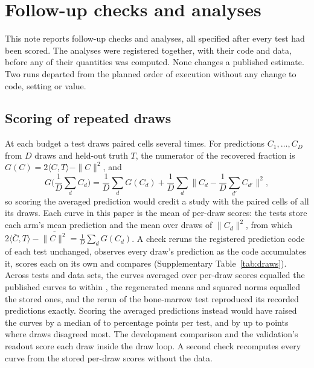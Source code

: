 \section{Follow-up checks and analyses}\label{sec:review}
This note reports follow-up checks and analyses, all specified after every test had been scored. The analyses were registered together, with their code and data, before any of their quantities was computed. None changes a published estimate. Two runs departed from the planned order of execution without any change to code, setting or value.

\subsection*{Scoring of repeated draws}
At each budget a test draws paired cells several times. For predictions $C_1,\dots,C_D$ from $D$ draws and held-out truth $T$, the numerator of the recovered fraction is $G(C)=2\langle C,T\rangle-\|C\|^2$, and
\[
G\Big(\frac1D\sum_dC_d\Big)=\frac1D\sum_dG(C_d)+\frac1D\sum_d\Big\|C_d-\frac1D\sum_{d'}C_{d'}\Big\|^2 ,
\]
so scoring the averaged prediction would credit a study with the paired cells of all its draws. Each curve in this paper is the mean of per-draw scores: the tests store each arm's mean prediction and the mean over draws of $\|C_d\|^2$, from which $2\langle\bar C,T\rangle-\overline{\|C\|^2}=\frac1D\sum_dG(C_d)$. A check reruns the registered prediction code of each test unchanged, observes every draw's prediction as the code accumulates it, scores each on its own and compares (Supplementary Table~\ref{tab:draws}). Across \RvDrawTests{} tests and data sets, the curves averaged over per-draw scores equalled the published curves to within \RvDrawMaxDiff, the regenerated means and squared norms equalled the stored ones, and the rerun of the bone-marrow test reproduced its recorded predictions exactly. Scoring the averaged predictions instead would have raised the curves by a median of \RvDrawInflMedianMin{} to \RvDrawInflMedianMax{} percentage points per test, and by up to \RvDrawInflMax{} points where draws disagreed most. The development comparison and the validation's readout score each draw inside the draw loop. A second check recomputes every curve from the stored per-draw scores without the data.

\begin{table}[h]
\caption{\textbf{Every recovery curve is the mean of per-draw scores.} Per test or data set: held-out units whose predictions were regenerated (of all units; each benchmark data set was rerun for the first of its three folds), draws per budget, the largest absolute difference between the curve averaged over per-draw scores and the published curve (or, for partial reruns, the fold's stored terms), the largest relative difference between the stored and regenerated mean squared norms, and the median and largest amount, in percentage points of recovered fraction, by which scoring the averaged prediction would have exceeded the published curve. External test: every draw's prediction is stored.}
\label{tab:draws}
\centering\footnotesize

\end{table}

